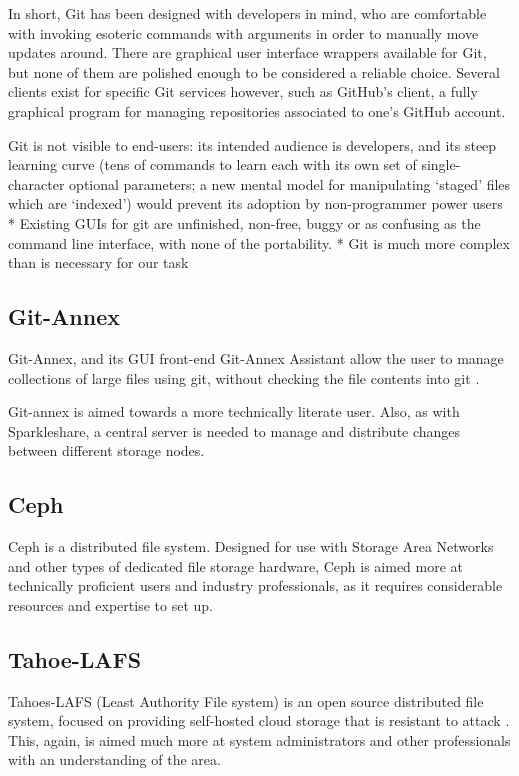 \documentclass[12pt,a4paper,]{adreport}
\begin{document}
In short, Git has been designed with developers in mind, who are
comfortable with invoking esoteric commands with arguments in order to
manually move updates around. There are graphical user interface
wrappers available for Git, but none of them are polished enough to be
considered a reliable choice. Several clients exist for specific Git
services however, such as GitHub's client, a fully graphical program for
managing repositories associated to one's GitHub account.

Git is not visible to end-users: its intended audience is developers,
and its steep learning curve (tens of commands to learn each with its
own set of single-character optional parameters; a new mental model for
manipulating `staged' files which are `indexed') would prevent its
adoption by non-programmer power users * Existing GUIs for git are
unfinished, non-free, buggy or as confusing as the command line
interface, with none of the portability. * Git is much more complex than
is necessary for our task

\subsection{Git-Annex}\label{git-annex}

Git-Annex, and its GUI front-end Git-Annex Assistant allow the user to
manage collections of large files using git, without checking the file
contents into git \cite{Joey Hess}.

Git-annex is aimed towards a more technically literate user. Also, as
with Sparkleshare, a central server is needed to manage and distribute
changes between different storage nodes.

\subsection{Ceph}\label{ceph}

Ceph is a distributed file system. Designed for use with Storage Area
Networks and other types of dedicated file storage hardware, Ceph is
aimed more at technically proficient users and industry professionals,
as it requires considerable resources and expertise to set up.

\subsection{Tahoe-LAFS}\label{tahoe-lafs}

Tahoes-LAFS (Least Authority File system) is an open source distributed
file system, focused on providing self-hosted cloud storage that is
resistant to attack \cite{Tahoe-OPS}. This, again, is aimed much more at system administrators and other professionals with an understanding of the
area.
\end{document}
